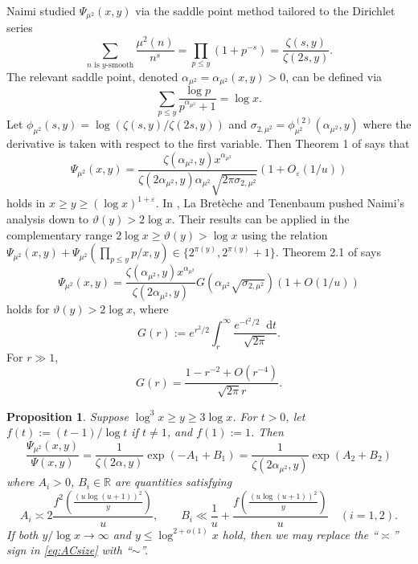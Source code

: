 \documentclass{amsart}
\theoremstyle{plain}
\newtheorem{prop}[thm]{Proposition}
\theoremstyle{remark}
\newcommand*\diff{\mathop{}\!\mathrm{d}}
\begin{document}
Naimi \cite{Naimi} studied $\Psi_{\mu^2}(x,y)$ via the saddle point method tailored to the Dirichlet series 
\[\sum_{n \text{ is }y\text{-smooth}} \frac{\mu^2(n)}{n^s} =\prod_{p\le y}(1+p^{-s})= \frac{\zeta(s,y)}{\zeta(2s,y)}.\]
The relevant saddle point, denoted  $\alpha_{\mu^2}=\alpha_{\mu^2}(x,y)>0$, can be defined via 
\[ \sum_{p \le y} \frac{\log p}{p^{\alpha_{\mu^2}}+1}=\log x.\]
Let $\phi_{\mu^2}(s,y)= \log (\zeta(s,y)/\zeta(2s,y))$ and $\sigma_{2,\mu^2}=\phi_{\mu^2}^{(2)}(\alpha_{\mu^2},y)$ where the derivative is taken with respect to the first variable. Then Theorem 1 of \cite{Naimi} says that 
\begin{equation}\label{eq:naimi} \Psi_{\mu^2}(x,y) = \frac{\zeta(\alpha_{\mu^2},y)x^{\alpha_{\mu^2}}}{\zeta(2\alpha_{\mu^2},y)\alpha_{\mu^2}\sqrt{2 \pi \sigma_{2,\mu^2}}} (1+O_{\varepsilon}(1/u))
\end{equation}
holds in  $ x\ge y \ge (\log x)^{1+\varepsilon}$. In \cite{TenenbaumSfree}, La Bret\`eche and Tenenbaum pushed Naimi's analysis down to $\vartheta(y) > 2 \log x$. Their results can be applied in the complementary range  $2\log x\ge \vartheta(y)>\log x$ using the relation $\Psi_{\mu^2}(x,y) + \Psi_{\mu^2}(\prod_{p \le y}p/x,y) \in \{ 2^{\pi(y)}, 2^{\pi(y)}+1\}$. Theorem 2.1 of \cite{TenenbaumSfree} says
\begin{equation}\label{eq:TenenbaumSfree} \Psi_{\mu^2}(x,y) = \frac{\zeta(\alpha_{\mu^2},y)x^{\alpha_{\mu^2}} }{\zeta(2\alpha_{\mu^2},y)}G(\alpha_{\mu^2}\sqrt{\sigma_{2,\mu^2}})(1+O(1/u)) 
\end{equation}
holds for $\vartheta(y)>2\log x$, where
\[G(r):=e^{r^2/2}\int_{r}^{\infty}\frac{e^{-t^2/2}\diff{t}}{\sqrt{2\pi}}.\]
For $r \gg 1$,
\begin{equation}\label{eq:Gasymp}
G(r) = \frac{1-r^{-2}+O(r^{-4})}{\sqrt{2\pi}r}.
\end{equation}  
\begin{prop}\label{prop:sfree}
	Suppose $\log^3 x\ge y \ge 3\log x$. For $t>0$, let $f(t):=(t-1)/\log t$  if $t \neq 1$, and $f(1):=1$.	Then 
	\[ \frac{\Psi_{\mu^2}(x,y)}{\Psi(x,y)} = \frac{1}{\zeta(2\alpha,y)}\exp(-A_1+B_1)=\frac{1}{\zeta(2\alpha_{\mu^2},y)}\exp(A_2+B_2)\]
	where $A_i>0$, $B_i \in \mathbb{R}$ are quantities satisfying \begin{equation}\label{eq:ACsize}
		A_i \asymp  2\frac{f^2\left( \frac{(u\log(u+1))^2}{y}\right)}{u}, \qquad B_i \ll \frac{1}{u}+\frac{f\left( \frac{(u\log(u+1))^2}{y}\right)}{u}\quad (i=1,2).
	\end{equation}
	If both $y/\log x \to \infty$ and  $y \le \log^{2+o(1)}x$ hold, then we may replace the  ``$\asymp$'' sign in \eqref{eq:ACsize} with ``$\sim$''.
\end{prop}
\end{document}
